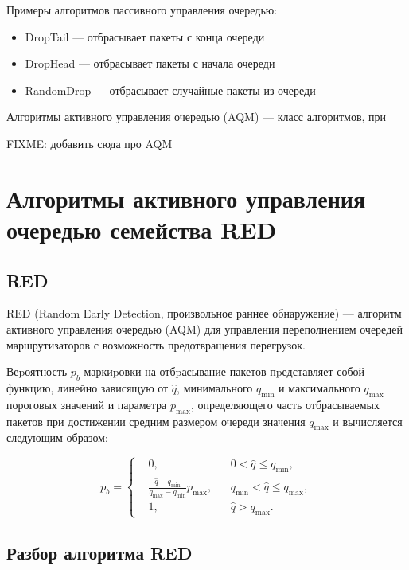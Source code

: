 Примеры алгоритмов пассивного управления очередью:

\begin{itemize}
  \item DropTail --- отбрасывает пакеты с конца очереди
  \item DropHead --- отбрасывает пакеты с начала очереди 
  \item RandomDrop --- отбрасывает случайные пакеты из очереди 
\end{itemize}


Алгоритмы активного управления очередью (AQM) --- класс алгоритмов, при

FIXME: добавить сюда про AQM








\section{Алгоритмы активного управления очередью семейства RED}
\label{chap1:sec3}

\subsection{RED}
\label{chap1:sec3:sub1}

RED \cite{red-1993} (Random Early Detection, произвольное раннее
обнаружение) --- алгоритм активного управления очередью (AQM) для
управления переполнением очередей маршрутизаторов с возможность
предотвращения перегрузок.

Веpоятность $p_{b}$ маркиpовки на отбpасывание пакетов пpедставляет
собой функцию, линейно зависящую от $\hat{q}$, минимального $q_{\min}$
и максимального $q_{\max}$ пороговых значений и параметра $p_{\max}$,
определяющего часть отбрасываемых пакетов при достижении средним
размером очереди значения $q_{\max}$ и вычисляется следующим образом:

\[
p_{b} = \left\{
  \begin{aligned}
& 0, &&    0 < \hat{q} \leqslant q_{\min}, \\
& \frac{\hat{q} - q_{\min}}{q_{\max} - q_{\min}} p_{\max}, &&  q_{\min} < \hat{q} \leqslant q_{\max} ,\\
& 1, &&   \hat{q} > q_{\max}. 
  \end{aligned}
\right.
\]

\subsection{Разбор алгоритма RED}
\label{chap1:sec3:sub2}

